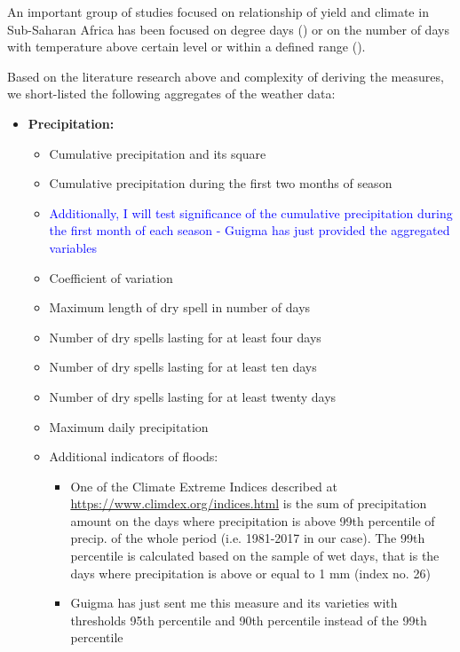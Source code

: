 \documentclass[a4paper,12pt]{article}
\begin{document}
An important group of studies focused on relationship of yield and climate in Sub-Saharan Africa has been focused on degree days (\citealt{SchulzeEtA1993,TingemEtAl2008,WalkerSchulze2008,TingemEtAl2009}) or on the number of days with temperature above certain level or within a defined range (\citealt{Giannakopoulos2009,LauxEtAl}).




Based on the literature research above and complexity of deriving the measures, we short-listed the following aggregates of the weather data:



\begin{itemize}

\item \textbf{\textbf{Precipitation}:}

\begin{itemize}
\item Cumulative precipitation and its square
\item Cumulative precipitation during the first two months of season
\item \textcolor{blue}{Additionally, I will test significance of the cumulative precipitation  during the first month of each season - Guigma has just provided the aggregated variables}


\item Coefficient of variation
\item Maximum length of dry spell in number of days
\item Number of dry spells lasting for at least four days
\item Number of dry spells lasting for at least ten days
\item Number of dry spells lasting for at least twenty days
\item Maximum daily precipitation
\color{blue}
\item Additional indicators of floods:

\begin{itemize}
\item One of the Climate Extreme Indices described at \url{https://www.climdex.org/indices.html} is the sum of precipitation amount on the days where precipitation is above 99th percentile of precip. of the whole period (i.e. 1981-2017 in our case). The 99th percentile is calculated based on the sample of wet days, that is the days where precipitation is above or equal to 1 mm (index no. 26)
\item Guigma has just sent me this measure and its varieties with thresholds 95th percentile and 90th percentile instead of the 99th percentile
\end{itemize}
\color{black}


\end{itemize}
\end{itemize}
\end{document}
